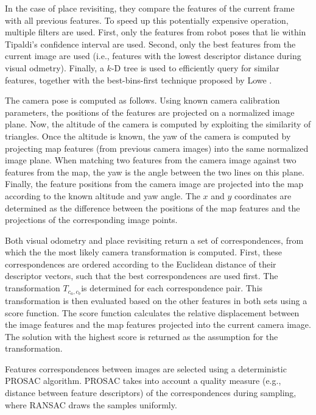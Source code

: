 In the case of place revisiting, they compare the features of the current frame with all previous features.
To speed up this potentially expensive operation, multiple filters are used.
First, only the features from robot poses that lie within Tipaldi's \cite{tipaldi2007approximate} confidence interval are used.
Second, only the best features from the current image are used (i.e., features with the lowest descriptor distance during visual odmetry).
Finally, a $k$-D tree is used to efficiently query for similar features, together with the best-bins-first technique proposed by Lowe \cite{lowe1999object}.

The camera pose is computed as follows.
Using known camera calibration parameters, the positions of the features are projected on a normalized image plane.
Now, the altitude of the camera is computed by exploiting the similarity of triangles.
Once the altitude is known, the yaw of the camera is computed by projecting map features (from previous camera images) into the same normalized image plane.
When matching two features from the camera image against two features from the map, the yaw is the angle between the two  lines on this plane.
Finally, the feature positions from the camera image are projected into the map according to the known altitude and yaw angle.
The $x$ and $y$ coordinates are determined as the difference between the positions of the map features and the projections of the corresponding image points.

Both visual odometry and place revisiting return a set of correspondences, from which the the most likely camera transformation is computed.
First, these correspondences are ordered according to the Euclidean distance of their descriptor vectors, such that the best correspondences are used first.
The transformation $T_{c_a,c_b}$is determined for each correspondence pair.
This transformation is then evaluated based on the other features in both sets using a score function.
The score function calculates the relative displacement between the image features and the map features projected into the current camera image.
The solution with the highest score is returned as the assumption for the transformation.

Features correspondences between images are selected using a deterministic PROSAC \cite{chum2005matching} algorithm.
PROSAC takes into account a quality measure (e.g., distance between feature descriptors) of the correspondences during sampling, where RANSAC draws the samples uniformly.

